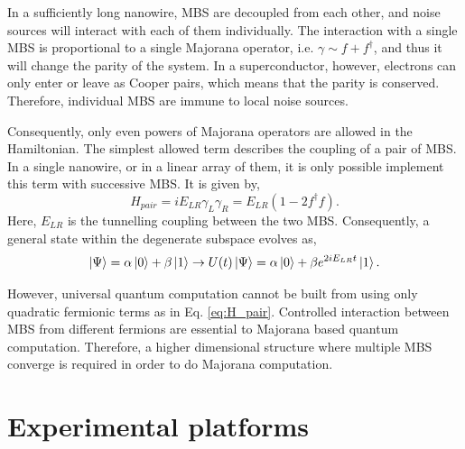 In a sufficiently long nanowire, MBS are decoupled from each other, and noise sources will interact with each of them individually.
The interaction with a single MBS is proportional to a single Majorana operator, i.e. $\gamma \sim f + f^{\dagger}$, and thus it will change the parity of the system.
In a superconductor, however, electrons can only enter or leave as Cooper pairs, which means that the parity is conserved. 
Therefore, individual MBS are immune to local noise sources.

Consequently, only even powers of Majorana operators are allowed in the Hamiltonian.
The simplest allowed term describes the coupling of a pair of MBS.
In a single nanowire, or in a linear array of them, it is only possible implement this term with successive MBS.
It is given by,
\begin{equation}\label{eq:H_pair}
H_{pair} = i E_{LR} \gamma_{L} \gamma_{R} = E_{LR} (1 - 2 f^{\dagger} f).
\end{equation}
Here, $E_{LR}$ is the tunnelling coupling between the two MBS.
Consequently, a general state within the degenerate subspace evolves as,
\begin{equation}
\ket{\Psi}  = \alpha \ket 0 +\beta \ket 1 \rightarrow U(t) \ket{\Psi} = \alpha \ket 0 + \beta e^{2 i E_{LR} t} \ket 1.
\end{equation}

However, universal quantum computation cannot be built from using only quadratic fermionic terms as in Eq. \ref{eq:H_pair}.
Controlled interaction between MBS from different fermions are essential to Majorana based quantum computation\cite{Sau2011, Leijse2021, Bauer2018}.
Therefore, a higher dimensional structure where multiple MBS converge is required in order to do Majorana computation.

\section{Experimental platforms}

